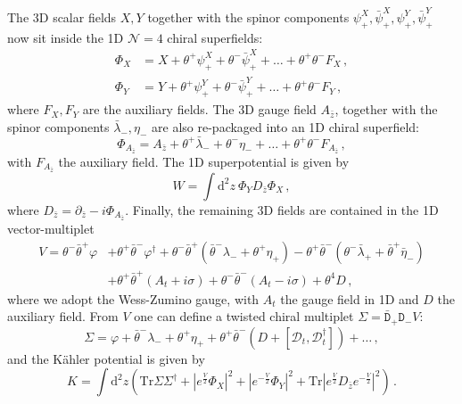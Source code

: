 \documentclass[12pt,a4paper]{article}
\renewcommand{\(}{\left(}
\renewcommand{\)}{\right)}
\renewcommand{\(}{\left(}
\renewcommand{\)}{\right)}
\begin{document}
The 3D scalar fields $X,Y$ together with the spinor components $\psi^X_+,\bar{\psi}^X_+,\psi^Y_+,\bar{\psi}^Y_+$ now sit inside the 1D $\mathcal{N}=4$ chiral superfields:
\begin{equation}\label{eq:vqm_XY}
\begin{aligned}
\Phi_X&=X+\theta^+\psi^X_+ +\theta^-\bar{\psi}^X_++\dots+\theta^+\theta^-F_X\,,\\
\Phi_Y&=Y+\theta^+\psi^Y_+ +\theta^-\bar{\psi}^Y_++\dots+\theta^+\theta^-F_Y\,,
\end{aligned}
\end{equation}
where $F_X,F_Y$ are the auxiliary fields. 
The 3D gauge field $A_{\bar{z}}$, together with the spinor components $\bar{\lambda}_-,\eta_-$ are also re-packaged into an 1D chiral superfield:
\begin{equation}\label{eq:vqm_Azb}
\Phi_{A_{\bar{z}}}=A_{\bar{z}}+\theta^+\bar{\lambda}_- +\theta^-\eta_-+\dots+\theta^+\theta^-F_{A_{\bar{z}}}\,,
\end{equation}
with $F_{A_{\bar{z}}}$ the auxiliary field. 
The 1D superpotential is given by
\begin{equation}\label{eq:vqm_superpotential}
W=\int \mathrm{d}^2z\ \Phi_Y D_{\bar{z}}\Phi_X\,,
\end{equation}
where $D_{\bar{z}}=\partial_{\bar{z}}-i\Phi_{A_{\bar{z}}}$. Finally, the remaining 3D fields are contained in the 1D vector-multiplet
\begin{equation}\label{eq:vqm_vector}
\begin{aligned}
V= \theta^-\bar{\theta}^+\varphi&+\theta^+\bar{\theta}^-\varphi^\dag+ \theta^-\bar{\theta}^+(\bar{\theta}^- \lambda_- +\theta^+\eta_+)-\theta^+\bar{\theta}^-(\theta^- \bar{\lambda}_+ +\bar{\theta}^+\bar{\eta}_-)\\
&+\theta^+\bar{\theta}^+(A_t+i\sigma)+\theta^-\bar{\theta}^-(A_t-i\sigma)+\theta^4D\,,
 \end{aligned}
\end{equation}
where we adopt the Wess-Zumino gauge, with $A_t$ the gauge field in 1D and $D$ the auxiliary field. 
From $V$ one can define a twisted chiral multiplet $\Sigma=\bar{\mathtt{D}}_+\mathtt{D}_-V$:
\begin{equation}
\Sigma=\varphi+\bar{\theta}^-\lambda_- +\theta^+\eta_+ +\theta^+\bar{\theta}^-(D+[\mathcal{D}_t,\mathcal{D}_t^\dag])+\dots\,,
\end{equation}
and the K\"{a}hler potential is given by
\begin{equation}\label{eq:vqm_kahler}
K=\int\mathrm{d}^2z\left(\mathrm{Tr}\Sigma\Sigma^\dag +|e^{\frac{V}{2}}\Phi_X|^2+|e^{-\frac{V}{2}}\Phi_Y|^2+\mathrm{Tr}|e^{\frac{V}{2}}D_{\bar{z}}e^{-\frac{V}{2}}|^2\right)\,.
\end{equation}
\end{document}
